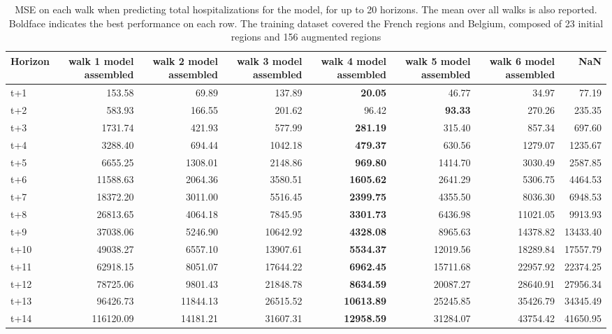 \begin{table}[H]
\centering
\caption{MSE on each walk when predicting total hospitalizations for the model, for up to 20 horizons. The mean over all walks is also reported. Boldface indicates the best performance on each row. The training dataset covered the French regions and Belgium, composed of 23 initial regions and 156 augmented regions }
\label{tab:MSE_walk_assembly}
\begin{tabular}{lrrrrrrr}
\toprule
Horizon &  walk 1 model assembled &  walk 2 model assembled &  walk 3 model assembled &  walk 4 model assembled &  walk 5 model assembled &  walk 6 model assembled &       NaN \\
\midrule
t+1  & 153.58  & 69.89  & 137.89  & \textbf{20.05}  & 46.77  & 34.97  & 77.19  \\
t+2  & 583.93  & 166.55  & 201.62  & 96.42  & \textbf{93.33}  & 270.26  & 235.35  \\
t+3  & 1731.74  & 421.93  & 577.99  & \textbf{281.19}  & 315.40  & 857.34  & 697.60  \\
t+4  & 3288.40  & 694.44  & 1042.18  & \textbf{479.37}  & 630.56  & 1279.07  & 1235.67  \\
t+5  & 6655.25  & 1308.01  & 2148.86  & \textbf{969.80}  & 1414.70  & 3030.49  & 2587.85  \\
t+6  & 11588.63  & 2064.36  & 3580.51  & \textbf{1605.62}  & 2641.29  & 5306.75  & 4464.53  \\
t+7  & 18372.20  & 3011.00  & 5516.45  & \textbf{2399.75}  & 4355.50  & 8036.30  & 6948.53  \\
t+8  & 26813.65  & 4064.18  & 7845.95  & \textbf{3301.73}  & 6436.98  & 11021.05  & 9913.93  \\
t+9  & 37038.06  & 5246.90  & 10642.92  & \textbf{4328.08}  & 8965.63  & 14378.82  & 13433.40  \\
t+10  & 49038.27  & 6557.10  & 13907.61  & \textbf{5534.37}  & 12019.56  & 18289.84  & 17557.79  \\
t+11  & 62918.15  & 8051.07  & 17644.22  & \textbf{6962.45}  & 15711.68  & 22957.92  & 22374.25  \\
t+12  & 78725.06  & 9801.43  & 21848.78  & \textbf{8634.59}  & 20087.27  & 28640.91  & 27956.34  \\
t+13  & 96426.73  & 11844.13  & 26515.52  & \textbf{10613.89}  & 25245.85  & 35426.79  & 34345.49  \\
t+14  & 116120.09  & 14181.21  & 31607.31  & \textbf{12958.59}  & 31284.07  & 43754.42  & 41650.95  \\

\end{tabular}
\end{table}
